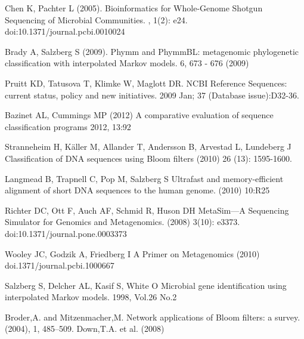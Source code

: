 \documentclass[12pt]{article} %
\begin{document}
\begin{thebibliography}{99} %
Chen K, Pachter L (2005). 
\newblock Bioinformatics for Whole-Genome Shotgun Sequencing of Microbial Communities. 
, 1(2): e24. doi:10.1371/journal.pcbi.0010024

Brady A, Salzberg S (2009).
\newblock Phymm and PhymmBL: metagenomic phylogenetic classification with interpolated Markov models.
 6, 673 - 676 (2009) 

Pruitt KD, Tatusova T, Klimke W, Maglott DR. 
\newblock NCBI Reference Sequences: current status, policy and new initiatives. 
 2009 Jan; 37 (Database issue):D32-36.

Bazinet AL, Cummings MP (2012)
\newblock A comparative evaluation of sequence classification programs
 2012, 13:92

Stranneheim H, Käller M,  Allander T,  Andersson B,  Arvestad L,  Lundeberg J 
\newblock Classification of DNA sequences using Bloom filters
 (2010) 26 (13): 1595-1600.

Langmead B,  Trapnell C,  Pop M,  Salzberg S
\newblock Ultrafast and memory-efficient alignment of short DNA sequences to the human genome.
 (2010) 10:R25

Richter DC, Ott F, Auch AF, Schmid R, Huson DH 
\newblock MetaSim—A Sequencing Simulator for Genomics and Metagenomics. 
 (2008) 3(10): e3373. doi:10.1371/journal.pone.0003373

Wooley JC, Godzik A, Friedberg I
\newblock A Primer on Metagenomics
 (2010) doi.1371/journal.pcbi.1000667

Salzberg S, Delcher AL, Kasif S, White O
\newblock Microbial gene identification using interpolated Markov models.
 1998, Vol.26 No.2

Broder,A. and Mitzenmacher,M. 
\newblock Network applications of Bloom ﬁlters: a survey.
 (2004), 1, 485–509.
Down,T.A. et al. (2008) 
\end{thebibliography}
\newpage
\end{document}
